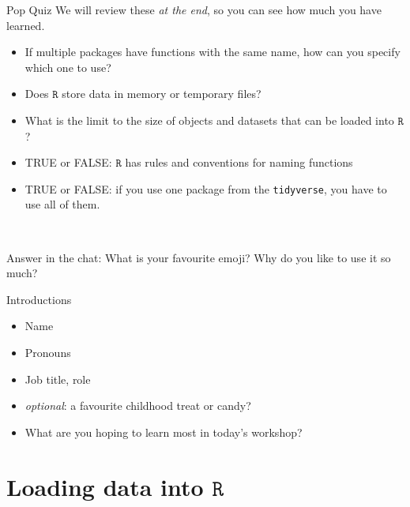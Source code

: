 \documentclass[
  11pt,
  ignorenonframetext,
]{beamer}
\providecommand{\tightlist}{%
  \setlength{\itemsep}{0pt}\setlength{\parskip}{0pt}}
\newcommand{\R}{\texttt{R}}
\newcommand{\fade}[1]{\textcolor[rgb]{0.66,0.66,0.66}{#1}}
\newcommand{\annote}[1]{{\footnotesize #1}}
\begin{document}
\begin{frame}[fragile]{Pop Quiz}
\protect\hypertarget{pop-quiz}{}
\annote{\fade{We will review these \textit{at the end}, so you can see how much you have learned.}}

\begin{itemize}
\tightlist
\item
  If multiple packages have functions with the same name, how can you
  specify which one to use?
\item
  Does \(\R\) store data in memory or temporary files?
\item
  What is the limit to the size of objects and datasets that can be
  loaded into \(\R\)?
\item
  TRUE or FALSE: \(\R\) has rules and conventions for naming functions
\item
  TRUE or FALSE: if you use one package from the \texttt{tidyverse}, you
  have to use all of them.
\end{itemize}

~

\begin{block}{Answer in the chat:}
\protect\hypertarget{answer-in-the-chat}{}
What is your favourite emoji? Why do you like to use it so much?
\end{block}
\end{frame}

\begin{frame}{Introductions}
\protect\hypertarget{introductions}{}
\begin{itemize}
\tightlist
\item
  Name
\item
  Pronouns
\item
  Job title, role
\item
  \emph{optional}: a favourite childhood treat or candy?
\end{itemize}

\begin{itemize}
\tightlist
\item
  What are you hoping to learn most in today's workshop?
\end{itemize}
\end{frame}

\hypertarget{loading-data-into-r}{%
\section{\texorpdfstring{Loading data into
\(\R\)}{Loading data into \textbackslash R}}\label{loading-data-into-r}}
\end{document}
